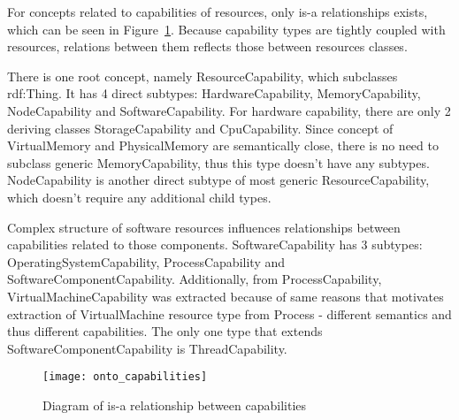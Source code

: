 For concepts related to capabilities of resources, only is-a relationships exists, which can be seen in
Figure~\ref{fig:onto_capabilities}. Because capability types are tightly coupled with resources, relations between them
reflects those between resources classes. 

There is one root concept, namely ResourceCapability, which subclasses rdf:Thing. It has 4 direct subtypes:
HardwareCapability, MemoryCapability, NodeCapability and SoftwareCapability. For hardware capability, there are only 2
deriving classes StorageCapability and CpuCapability. Since concept of VirtualMemory and PhysicalMemory are semantically
close, there is no need to subclass generic MemoryCapability, thus this type doesn't have any subtypes. NodeCapability
is another direct subtype of most generic ResourceCapability, which doesn't require any additional child types. 

Complex structure of software resources influences relationships between capabilities related to those components.
SoftwareCapability has 3 subtypes: OperatingSystemCapability, ProcessCapability and SoftwareComponentCapability.
Additionally, from ProcessCapability, VirtualMachineCapability was extracted because of same reasons that motivates
extraction of VirtualMachine resource type from Process - different semantics and thus different capabilities. The only
one type that extends SoftwareComponentCapability is ThreadCapability.


\begin{figure}[ht]
  \centering
  \texttt{[image: onto\_capabilities]}
  \caption{Diagram of is-a relationship between capabilities}
  \label{fig:onto_capabilities}
\end{figure}





